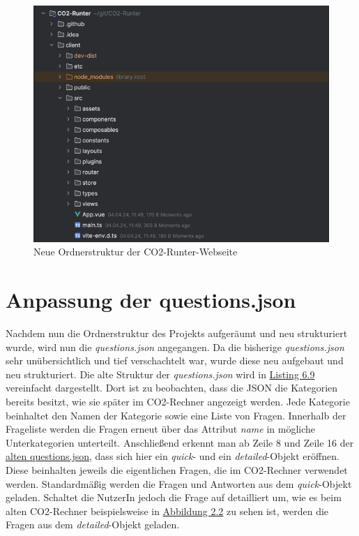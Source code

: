 \begin{figure}[h]
    \centering
    \includegraphics[width=1\textwidth]{images/06/ordnerstruktur_projekt.png}
    \caption{Neue Ordnerstruktur der CO2-Runter-Webseite}
    \label{fig:ordnerstruktur_neu}
\end{figure}

\section{Anpassung der questions.json}
\label{sec:anpassung-der-questions-json}

Nachdem nun die Ordnerstruktur des Projekts aufgeräumt und neu strukturiert wurde, wird nun die \textit{questions.json} angegangen. Da die bisherige \textit{questions.json} sehr unübersichtlich und tief verschachtelt war, wurde diese neu aufgebaut und neu strukturiert. Die alte Struktur der \textit{questions.json} wird in \hyperref[lst:questions-json-old]{Listing 6.9} vereinfacht dargestellt. Dort ist zu beobachten, dass die \acs{JSON} die Kategorien bereits besitzt, wie sie später im CO2-Rechner angezeigt werden. Jede Kategorie beinhaltet den Namen der Kategorie sowie eine Liste von Fragen. Innerhalb der Frageliste werden die Fragen erneut über das Attribut \textit{name} in mögliche Unterkategorien unterteilt. Anschließend erkennt man ab Zeile 8 und Zeile 16 der \hyperref[lst:questions-json-old]{alten questions.json}, dass sich hier ein \textit{quick}- und ein \textit{detailed}-Objekt eröffnen. Diese beinhalten jeweils die eigentlichen Fragen, die im CO2-Rechner verwendet werden. Standardmäßig werden die Fragen und Antworten aus dem \textit{quick}-Objekt geladen. Schaltet die NutzerIn jedoch die Frage auf detailliert um, wie es beim alten CO2-Rechner beispielsweise in \hyperref[fig:co2runterapp-rechner]{Abbildung 2.2} zu sehen ist, werden die Fragen aus dem \textit{detailed}-Objekt geladen.

